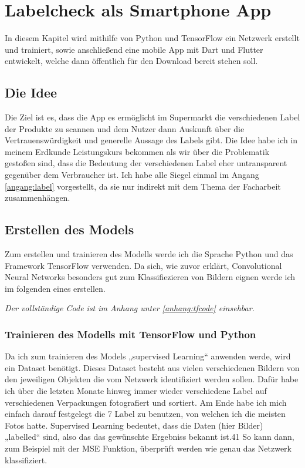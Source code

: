 \section{Labelcheck als Smartphone App}\label{labelcheck}

In diesem Kapitel wird mithilfe von Python und TensorFlow ein Netzwerk erstellt und trainiert, sowie anschließend eine mobile App mit Dart und Flutter entwickelt, welche dann öffentlich für den Download bereit stehen soll.

\subsection{Die Idee}

Die Ziel ist es, dass die App es ermöglicht im Supermarkt die verschiedenen Label der Produkte zu scannen und dem Nutzer dann Auskunft über die Vertrauenswürdigkeit und generelle Aussage des Labels gibt. Die Idee habe ich in meinem Erdkunde Leistungskurs bekommen als wir über die Problematik gestoßen sind, dass die Bedeutung der verschiedenen Label eher untransparent gegenüber dem Verbraucher ist. Ich habe alle Siegel einmal im Angang \ref{angang:label} vorgestellt, da sie nur indirekt mit dem Thema der Facharbeit zusammenhängen.

\subsection{Erstellen des Models}\label{erstellen des modells}

Zum erstellen und trainieren des Modells werde ich die Sprache Python und das
Framework TensorFlow verwenden. Da sich, wie zuvor erklärt, Convolutional Neural Networks besonders gut zum Klassifiezieren von Bildern eignen werde ich im folgenden eines erstellen. 

\emph{Der vollständige Code ist im Anhang unter \ref{anhang:tfcode} einsehbar.}

\subsubsection{Trainieren des Modells mit TensorFlow und Python}

Da ich zum trainieren des Models „supervised Learning“ anwenden werde, wird ein Dataset benötigt. Dieses Dataset besteht aus vielen verschiedenen Bildern von den jeweiligen Objekten die vom Netzwerk identifiziert werden sollen. Dafür habe ich über die letzten Monate hinweg immer wieder verschiedene Label auf verschiedenen Verpackungen fotografiert und sortiert. Am Ende habe ich mich einfach darauf festgelegt die 7 Label zu benutzen, von welchen ich die meisten Fotos hatte. Supervised Learning bedeutet, dass die Daten (hier Bilder) „labelled“ sind, also das das gewünschte Ergebniss bekannt ist.41 So kann dann, zum Beispiel mit der MSE Funktion, überprüft werden wie genau das Netzwerk klassifiziert.


